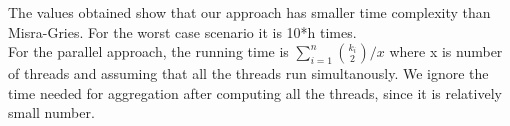 The values obtained show that our approach has smaller time complexity than Misra-Gries. For the worst case scenario it is 10*h times.
\\
For the parallel approach, the running time is \(\sum\limits_{i=1}^n{k_i \choose 2}/x\) where x is number of threads and assuming that all the threads run simultanously. We ignore the time needed for aggregation after computing all the threads, since it is relatively small number.
